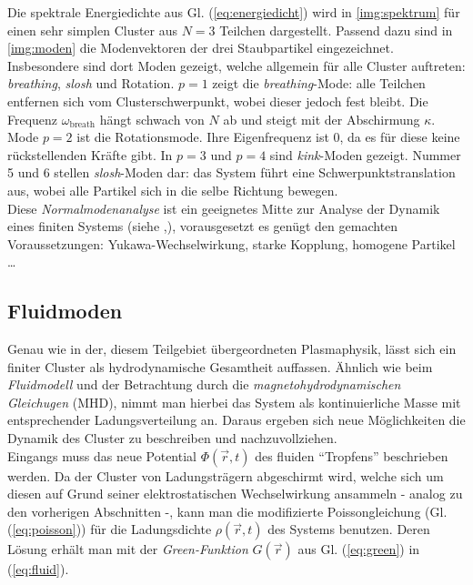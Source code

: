 \documentclass[numbers=noenddot,a4paper,notitlepage,twoside,BCOR15mm]{scrbook}
\newcommand{\ix}[1]{_\text{#1}}
\newcommand{\tilt}[1]{\textit{#1}}
\begin{document}
					Die spektrale Energiedichte aus Gl. (\ref{eq:energiedicht}) wird in \ref{img:spektrum} für einen sehr simplen Cluster aus $N=3$ Teilchen dargestellt. Passend dazu sind in \ref{img:moden} die Modenvektoren der drei Staubpartikel eingezeichnet. Insbesondere sind dort Moden gezeigt, welche allgemein für alle Cluster auftreten: \tilt{breathing}, \tilt{slosh} und Rotation. $p=1$ zeigt die \tilt{breathing}-Mode: alle Teilchen entfernen sich vom Clusterschwerpunkt, wobei dieser jedoch fest bleibt. Die Frequenz $\omega\ix{breath}$ hängt schwach von $N$ ab und steigt mit der Abschirmung $\kappa$. Mode $p=2$ ist die Rotationsmode. Ihre Eigenfrequenz ist $0$, da es für diese keine rückstellenden Kräfte gibt. In $p=3$ und $p=4$ sind \tilt{kink}-Moden gezeigt. Nummer 5 und 6 stellen \tilt{slosh}-Moden dar: das System führt eine Schwerpunktstranslation aus, wobei alle Partikel sich in die selbe Richtung bewegen.\\
					Diese \tilt{Normalmodenanalyse} ist ein geeignetes Mitte zur Analyse der Dynamik eines finiten Systems (siehe \cite{Melzer01},\cite{Melzer03}), vorausgesetzt es genügt den gemachten Voraussetzungen: Yukawa-Wechselwirkung, starke Kopplung, homogene Partikel \dots

				\subsection*{Fluidmoden}

					Genau wie in der, diesem Teilgebiet übergeordneten Plasmaphysik, lässt sich ein finiter Cluster als hydrodynamische Gesamtheit auffassen. Ähnlich wie beim \tilt{Fluidmodell} und der Betrachtung durch die \tilt{magnetohydrodynamischen Gleichugen} (MHD), nimmt man hierbei das System als kontinuierliche Masse mit entsprechender Ladungsverteilung an. Daraus ergeben sich neue Möglichkeiten die Dynamik des Cluster zu beschreiben und nachzuvollziehen.\\
					Eingangs muss das neue Potential $\Phi\left(\vec{r},t\right)$ des fluiden "`Tropfens"' beschrieben werden. Da der Cluster von Ladungsträgern abgeschirmt wird, welche sich um diesen auf Grund seiner elektrostatischen Wechselwirkung ansammeln - analog zu den vorherigen Abschnitten -, kann man die modifizierte Poissongleichung (Gl. (\ref{eq:poisson})) für die Ladungsdichte $\rho\left(\vec{r},t\right)$ des Systems benutzen. Deren Lösung erhält man mit der \tilt{Green-Funktion} $G\left(\vec{r}\right)$ aus Gl. (\ref{eq:green}) in (\ref{eq:fluid}). 
\end{document}
